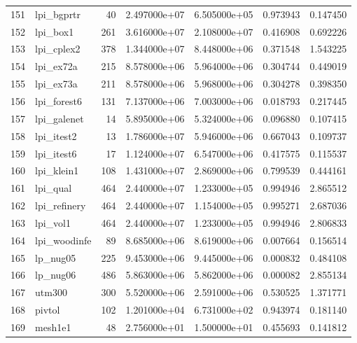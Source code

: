 \begin{tabular}{llrrrrr}
151 &               lpi\_bgprtr &    40 &  2.497000e+07 &  6.505000e+05 &  0.973943 &   0.147450 \\
152 &                 lpi\_box1 &   261 &  3.616000e+07 &  2.108000e+07 &  0.416908 &   0.692226 \\
153 &               lpi\_cplex2 &   378 &  1.344000e+07 &  8.448000e+06 &  0.371548 &   1.543225 \\
154 &                lpi\_ex72a &   215 &  8.578000e+06 &  5.964000e+06 &  0.304744 &   0.449019 \\
155 &                lpi\_ex73a &   211 &  8.578000e+06 &  5.968000e+06 &  0.304278 &   0.398350 \\
156 &              lpi\_forest6 &   131 &  7.137000e+06 &  7.003000e+06 &  0.018793 &   0.217445 \\
157 &              lpi\_galenet &    14 &  5.895000e+06 &  5.324000e+06 &  0.096880 &   0.107415 \\
158 &               lpi\_itest2 &    13 &  1.786000e+07 &  5.946000e+06 &  0.667043 &   0.109737 \\
159 &               lpi\_itest6 &    17 &  1.124000e+07 &  6.547000e+06 &  0.417575 &   0.115537 \\
160 &               lpi\_klein1 &   108 &  1.431000e+07 &  2.869000e+06 &  0.799539 &   0.444161 \\
161 &                 lpi\_qual &   464 &  2.440000e+07 &  1.233000e+05 &  0.994946 &   2.865512 \\
162 &             lpi\_refinery &   464 &  2.440000e+07 &  1.154000e+05 &  0.995271 &   2.687036 \\
163 &                 lpi\_vol1 &   464 &  2.440000e+07 &  1.233000e+05 &  0.994946 &   2.806833 \\
164 &             lpi\_woodinfe &    89 &  8.685000e+06 &  8.619000e+06 &  0.007664 &   0.156514 \\
165 &                 lp\_nug05 &   225 &  9.453000e+06 &  9.445000e+06 &  0.000832 &   0.484108 \\
166 &                 lp\_nug06 &   486 &  5.863000e+06 &  5.862000e+06 &  0.000082 &   2.855134 \\
167 &                   utm300 &   300 &  5.520000e+06 &  2.591000e+06 &  0.530525 &   1.371771 \\
168 &                   pivtol &   102 &  1.201000e+04 &  6.731000e+02 &  0.943974 &   0.181140 \\
169 &                  mesh1e1 &    48 &  2.756000e+01 &  1.500000e+01 &  0.455693 &   0.141812 \\

\end{tabular}
